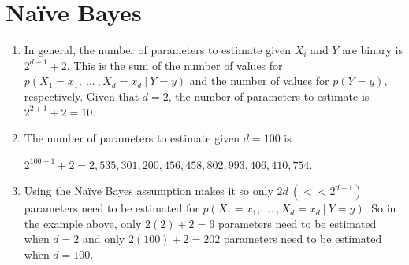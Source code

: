 \documentclass{article}
\begin{document}
\section{Na\"{i}ve Bayes}
\begin{enumerate}[label=(\alph*)]

\item In general, the number of parameters to estimate given $X_i$ and $Y$ are binary is $2^{d+1} + 2.$ This is the sum of the number of values for $p(X_1 = x_1,\:...\:,X_d = x_d\:|\:Y = y)$ and the number of values for $p(Y = y)$, respectively. Given that $d=2$, the number of parameters to estimate is $2^{2+1} + 2 = 10$. 

\item The number of parameters to estimate given $d = 100$ is 
\begin{center}$2^{100+1} + 2 = 2,535,301,200,456,458,802,993,406,410,754$.\end{center}

\item Using the Na\"{i}ve Bayes assumption makes it so only $2d\:( << 2^{d+1})$  parameters need to be estimated for $p(X_1 = x_1,\:...\:,X_d = x_d\:|\:Y = y)$. So in the example above, only $2(2) + 2 = 6$ parameters need to be estimated when $d = 2$ and only $2(100) + 2 = 202$ parameters need to be estimated when $d = 100$.

\end{enumerate}
\end{document}
